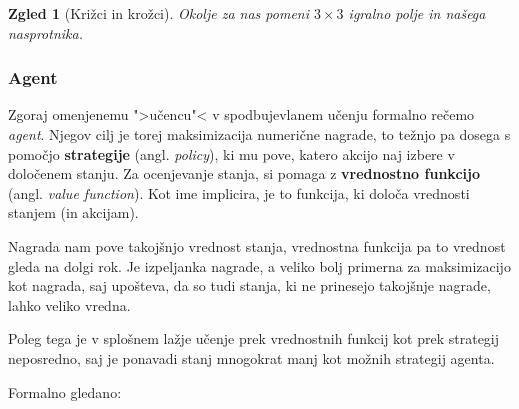 \documentclass[12pt,a4paper]{amsart}
\theoremstyle{definition} %
\theoremstyle{plain} %
\newtheorem{zgled}[definicija]{Zgled}
\begin{document}
\begin{zgled}[Križci in krožci]
    Okolje za nas pomeni $3\times3$ igralno polje in našega nasprotnika.
\end{zgled}

\subsubsection{Agent}
Zgoraj omenjenemu ">učencu"< v spodbujevlanem učenju formalno rečemo \textit{agent}. Njegov 
cilj je torej maksimizacija numerične nagrade, to težnjo pa dosega s pomočjo 
\textbf{strategije} (angl. \textit{policy}), ki mu pove, katero akcijo naj izbere v določenem 
stanju. Za ocenjevanje stanja, si pomaga z \textbf{vrednostno funkcijo} (angl. \textit{value 
function}). Kot ime implicira, je to funkcija, ki določa vrednosti stanjem (in akcijam). 

Nagrada nam pove takojšnjo vrednost stanja, vrednostna funkcija pa to vrednost gleda na dolgi
rok. Je izpeljanka nagrade, a veliko bolj primerna za maksimizacijo kot nagrada, saj upošteva,
da so tudi stanja, ki ne prinesejo takojšnje nagrade, lahko veliko vredna.

Poleg tega je v splošnem lažje učenje prek vrednostnih funkcij kot prek strategij neposredno, 
saj je ponavadi stanj mnogokrat manj kot možnih strategij agenta.

Formalno gledano:
\end{document}
